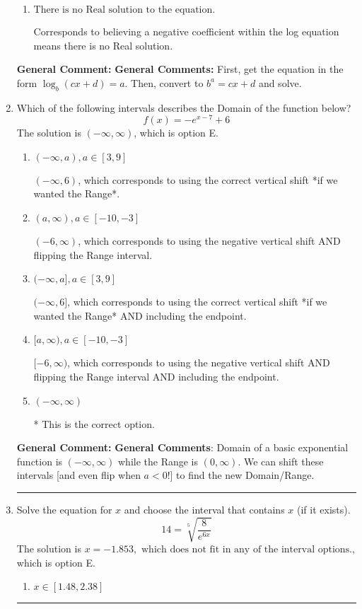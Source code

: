 \documentclass{extbook}[14pt]
\newcommand{\litem}[1]{\item #1

\rule{\textwidth}{0.4pt}}
\begin{document}
\begin{enumerate}
{\begin{enumerate}[label=\Alph*.]
$x = 18.667$, which corresponds to ignoring the vertical shift when converting to exponential form.
\item \( \text{There is no Real solution to the equation.} \)

Corresponds to believing a negative coefficient within the log equation means there is no Real solution.
\end{enumerate}

\textbf{General Comment:} \textbf{General Comments:} First, get the equation in the form $\log_b{(cx+d)} = a$. Then, convert to $b^a = cx+d$ and solve.
}
\litem{
Which of the following intervals describes the Domain of the function below?
\[ f(x) = -e^{x-7}+6 \]The solution is \( (-\infty, \infty) \), which is option E.\begin{enumerate}[label=\Alph*.]
\item \( (-\infty, a), a \in [3, 9] \)

$(-\infty, 6)$, which corresponds to using the correct vertical shift *if we wanted the Range*.
\item \( (a, \infty), a \in [-10, -3] \)

$(-6, \infty)$, which corresponds to using the negative vertical shift AND flipping the Range interval.
\item \( (-\infty, a], a \in [3, 9] \)

$(-\infty, 6]$, which corresponds to using the correct vertical shift *if we wanted the Range* AND including the endpoint.
\item \( [a, \infty), a \in [-10, -3] \)

$[-6, \infty)$, which corresponds to using the negative vertical shift AND flipping the Range interval AND including the endpoint.
\item \( (-\infty, \infty) \)

* This is the correct option.
\end{enumerate}

\textbf{General Comment:} \textbf{General Comments}: Domain of a basic exponential function is $(-\infty, \infty)$ while the Range is $(0, \infty)$. We can shift these intervals [and even flip when $a<0$!] to find the new Domain/Range.
}
\litem{
 Solve the equation for $x$ and choose the interval that contains $x$ (if it exists).
\[  14 = \sqrt[5]{\frac{8}{e^{6x}}} \]The solution is \( x = -1.853, \text{ which does not fit in any of the interval options.} \), which is option E.\begin{enumerate}[label=\Alph*.]
\item \( x \in [1.48, 2.38] \)


\end{enumerate}}
\end{enumerate}
\end{document}
